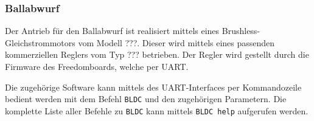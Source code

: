 \subsubsection{Ballabwurf}
Der Antrieb für den Ballabwurf ist realisiert mittels eines
Brushless-Gleichstrommotors vom Modell ???. Dieser wird mittels
eines passenden kommerziellen Reglers vom Typ ??? betrieben. Der Regler
wird gestellt durch die Firmware des Freedomboards, welche per UART.

Die zugehörige Software kann mittels des UART-Interfaces per
Kommandozeile bedient werden mit dem Befehl \verb!BLDC! und den
zugehörigen Parametern. Die komplette Liste aller Befehle zu
\verb!BLDC! kann mittels \verb!BLDC help! aufgerufen werden.
